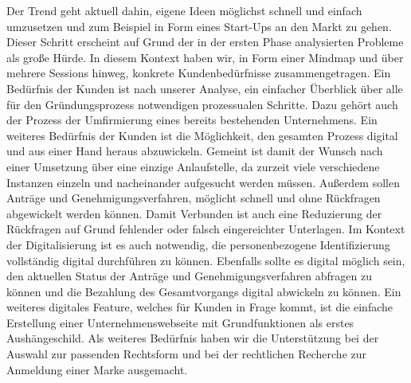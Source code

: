Der Trend geht aktuell dahin, eigene Ideen möglichst schnell und einfach umzusetzen und zum Beispiel in Form eines Start-Ups an den Markt zu gehen. Dieser Schritt erscheint auf Grund der in der ersten Phase analysierten Probleme als große Hürde. In diesem Kontext haben wir, in Form einer Mindmap und über mehrere Sessions hinweg, konkrete Kundenbedürfnisse zusammengetragen.
Ein Bedürfnis der Kunden ist nach unserer Analyse, ein einfacher Überblick über alle für den Gründungsprozess notwendigen prozessualen Schritte. Dazu gehört auch der Prozess der Umfirmierung eines bereits bestehenden Unternehmens.
Ein weiteres Bedürfnis der Kunden ist die Möglichkeit, den gesamten Prozess digital und aus einer Hand heraus abzuwickeln. Gemeint ist damit der Wunsch nach einer Umsetzung über eine einzige Anlaufstelle, da zurzeit viele verschiedene Instanzen einzeln und nacheinander aufgesucht werden müssen. Außerdem sollen Anträge und Genehmigungsverfahren, möglicht schnell und ohne Rückfragen abgewickelt werden können. Damit Verbunden ist auch eine Reduzierung der Rückfragen auf Grund fehlender oder falsch eingereichter Unterlagen.
Im Kontext der Digitalisierung ist es auch notwendig, die personenbezogene Identifizierung vollständig digital durchführen zu können. Ebenfalls sollte es digital möglich sein, den aktuellen Status der Anträge und Genehmigungsverfahren abfragen zu können und die Bezahlung des Gesamtvorgangs digital abwickeln zu können. Ein weiteres digitales Feature, welches für Kunden in Frage kommt, ist die einfache Erstellung einer Unternehmenswebseite mit Grundfunktionen als erstes Aushängeschild.
Als weiteres Bedürfnis haben wir die Unterstützung bei der Auswahl zur passenden Rechtsform und bei der rechtlichen Recherche zur Anmeldung einer Marke ausgemacht.